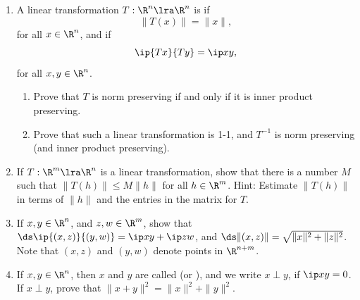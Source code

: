 \documentclass[11pt, a4paper, parskip=full]{scrartcl}
\begin{document}
\begin{enumerate}
\begin{enumerate}
\end{enumerate}

\item	A linear transformation $T:\R^n\lra\R^n$ is  if
$$\|T(x)\|=\|x\|,$$ for all $x\in\R^n$, and  if
$$\ip{Tx}{Ty} = \ip xy,$$ for all $x,y\in\R^n$.
\begin{enumerate}
	\item	Prove that $T$  is norm preserving if and only if it is inner
	product preserving.

	\item	Prove that such a linear transformation is 1-1, and $T^{-1}$ is
	norm preserving (and inner product preserving).
\end{enumerate}

\item\label{bddlin}	If $T:\R^m\lra\R^n$ is a linear transformation, show that there is a
number $M$ such that $\|T(h)\|\leq M\|h\|$ for all $h\in\R^m$.  Hint: Estimate
$\|T(h)\|$ in terms of $\|h\|$ and the entries in the matrix for $T$.

\item	If $x,y\in\R^n$, and $z,w\in\R^m$, show that $\ds\ip{(x,z)}{(y,w)} = \ip xy
+ \ip zw$, and $\ds\|(x,z)\| = \sqrt{\|x\|^2 + \|z\|^2}$.  Note that $(x,z)$ and
$(y,w)$ denote points in $\R^{n+m}$.

\item	If $x,y\in\R^n$, then $x$ and $y$ are called  (or
), and we write $x\perp y$, if $\ip xy = 0$.  If $x\perp y$,
prove that $\|x+y\|^2 = \|x\|^2 + \|y\|^2$.

\end{enumerate}
\end{document}
